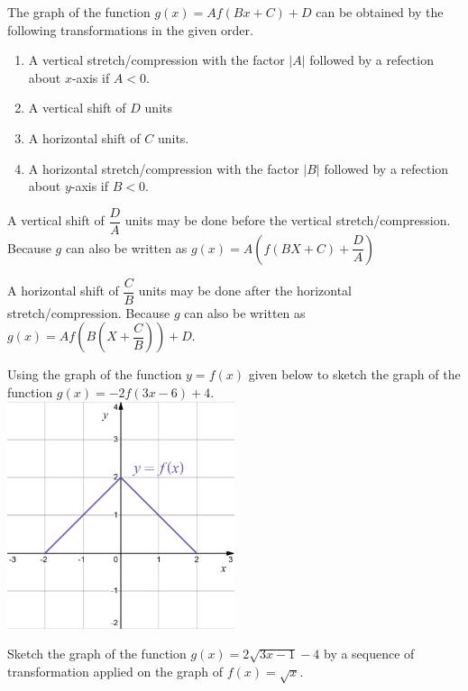 \begin{howto}
  The graph of the function $g(x)=Af(Bx+C)+D$ can be obtained by the following transformations in the given order.
  \begin{enumerate}
    \item A vertical stretch/compression with the factor $|A|$ followed by a refection about $x$-axis if $A<0$.
    \item A vertical shift of $D$ units
    \item A horizontal shift of $C$ units.
    \item A horizontal stretch/compression with the factor $|B|$ followed by a refection about $y$-axis if $B<0$.
  \end{enumerate}
\end{howto}
\begin{remark}
  A vertical shift of $\dfrac{D}{A}$ units may be done before the vertical stretch/compression. Because $g$ can also be written as $g(x)=A\left(f(BX+C)+\dfrac{D}{A}\right)$

  A horizontal shift of $\dfrac{C}{B}$ units may be done after the horizontal stretch/compression. Because $g$ can also be written as $g(x)=Af\left(B\left(X+\dfrac{C}{B}\right)\right)+D$.
\end{remark}
\begin{example}
  Using the graph of the function $y=f(x)$ given below to sketch the graph of the function $g(x)=-2f(3x-6)+4$.\\
  \includegraphics[width=0.5\textwidth]{figs/-abs(x)+2.png}
\end{example}

\newpage
\begin{example}
Sketch the graph of the function $g(x)=2\sqrt{3x-1}-4$ by a sequence of transformation applied on the graph of $f(x)=\sqrt{x}$.  
\end{example}


